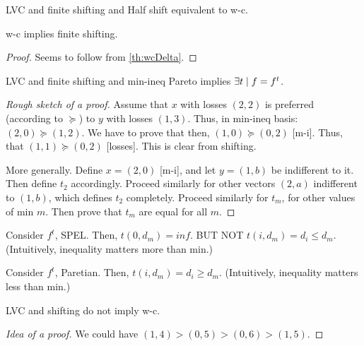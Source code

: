 \documentclass[version=3.21, pagesize, twoside=off, bibliography=totoc, DIV=calc, fontsize=12pt, a4paper]{scrartcl}
\begin{document}
\begin{conjecture}
	LVC and finite shifting and Half shift equivalent to w-c.
\end{conjecture}

\begin{conjecture}
	w-c implies finite shifting.
\end{conjecture}
\begin{proof}
	Seems to follow from \cref{th:wcDelta}.
\end{proof}

\begin{conjecture}
	LVC and finite shifting and min-ineq Pareto implies $\exists t \suchthat f = f^t$.
\end{conjecture}
\begin{proof}[Rough sketch of a proof]
	Assume that $x$ with losses $(2, 2)$ is preferred (according to $\succeq$) to $y$ with losses $(1, 3)$.
	Thus, in min-ineq basis: $(2, 0) \succeq (1, 2)$.
	We have to prove that then, $(1, 0) \succeq (0, 2)$ [m-i].
	Thus, that $(1, 1) \succeq (0, 2)$ [losses].
	This is clear from shifting.
	
	More generally.
	Define $x = (2, 0)$ [m-i], and let $y = (1, b)$ be indifferent to it. Then define $t_2$ accordingly. Proceed similarly for other vectors $(2, a)$ indifferent to $(1, b)$, which defines $t_2$ completely. Proceed similarly for $t_m$, for other values of min $m$. Then prove that $t_m$ are equal for all $m$.
\end{proof}

\begin{conjecture}
	Consider $f^t$, SPEL. Then, $t(0, d_m) = inf$. BUT NOT $t(i, d_m) = d_i ≤ d_m$. (Intuitively, inequality matters more than min.)
\end{conjecture}
\begin{conjecture}
	Consider $f^t$, Paretian. Then, $t(i, d_m) = d_i ≥ d_m$. (Intuitively, inequality matters less than min.)
\end{conjecture}

\begin{conjecture}
	LVC and shifting do not imply w-c.
\end{conjecture}
\begin{proof}[Idea of a proof]
%	
	
	We could have $(1, 4) > (0, 5) > (0, 6) > (1, 5)$.
\end{proof}
\end{document}
